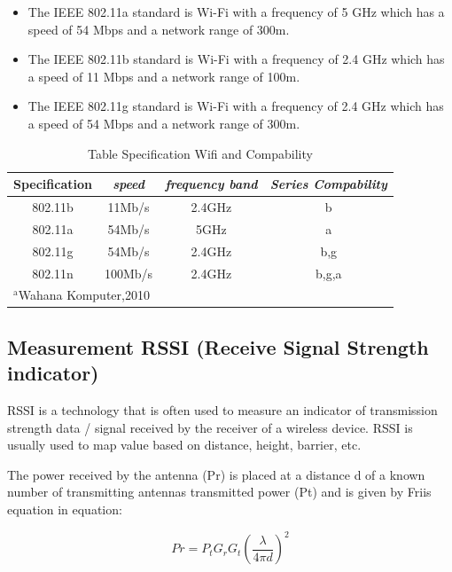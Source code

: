 \documentclass[conference]{IEEEtran}
\begin{document}
\begin{itemize}
    \item The IEEE 802.11a standard is Wi-Fi with a frequency of 5 GHz which has a
    speed of 54 Mbps and a network range of 300m. 
    \item The IEEE 802.11b standard is Wi-Fi with a frequency of 2.4 GHz which has a
    speed of 11 Mbps and a network range of 100m. 
  \item The IEEE 802.11g standard is Wi-Fi with a frequency of 2.4 GHz which has a
    speed of 54 Mbps and a network range of 300m.

\end{itemize}

\begin{table}[htbp]
    \caption{Table Specification Wifi and Compability}
    \begin{center}
    \begin{tabular}{|c|c|c|c|}
        \hline
    \textbf{Specification} & \textbf{\textit{speed}}& \textbf{\textit{frequency band}}& \textbf{\textit{Series Compability}} \\
    \hline
    802.11b & 11Mb/s & 2.4GHz & b  \\
    \hline
    802.11a & 54Mb/s & 5GHz & a  \\
    \hline
    802.11g & 54Mb/s & 2.4GHz & b,g  \\
    \hline
    802.11n & 100Mb/s & 2.4GHz & b,g,a  \\
    \hline
    \multicolumn{4}{l}{$^{\mathrm{a}}$Wahana Komputer,2010}
    \end{tabular}
    \label{tab1}
    \end{center}
    \end{table}


\subsection{Measurement RSSI (Receive Signal Strength indicator)}
RSSI is a technology that is often used to measure an indicator of transmission strength
data / signal received by the receiver of a wireless device. RSSI is usually used to map
value based on distance, height, barrier, etc.

The power received by the antenna (Pr) is placed at a distance d
of a known number of transmitting antennas
transmitted power (Pt) and is given by
Friis equation in equation:

\begin{equation}
    Pr = P_t G_r G_t 
    \left( 
        \frac{\lambda}{4 \pi d}
    \right) ^2
\end{equation}
\end{document}
